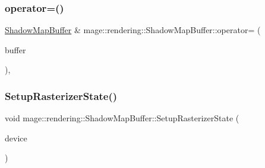\subsubsection{\texorpdfstring{operator=()}{operator=()}\hspace{0.1cm}{\footnotesize\ttfamily [2/2]}}
{\footnotesize\ttfamily \hyperlink{classmage_1_1rendering_1_1_shadow_map_buffer}{Shadow\+Map\+Buffer} \& mage\+::rendering\+::\+Shadow\+Map\+Buffer\+::operator= (\begin{DoxyParamCaption}\item[{\hyperlink{classmage_1_1rendering_1_1_shadow_map_buffer}{Shadow\+Map\+Buffer} \&\&}]{buffer }\end{DoxyParamCaption})\hspace{0.3cm}{\ttfamily [default]}, {\ttfamily [noexcept]}}

\hypertarget{classmage_1_1rendering_1_1_shadow_map_buffer_a04622e03086e5a16783bad043b8754a8}{}\label{classmage_1_1rendering_1_1_shadow_map_buffer_a04622e03086e5a16783bad043b8754a8} 
\subsubsection{\texorpdfstring{Setup\+Rasterizer\+State()}{SetupRasterizerState()}}
{\footnotesize\ttfamily void mage\+::rendering\+::\+Shadow\+Map\+Buffer\+::\+Setup\+Rasterizer\+State (\begin{DoxyParamCaption}\item[{I\+D3\+D11\+Device \&}]{device }\end{DoxyParamCaption})\hspace{0.3cm}{\ttfamily [private]}}

\hypertarget{classmage_1_1rendering_1_1_shadow_map_buffer_a3efe8318385c4807b1982873afa0e77b}{}\label{classmage_1_1rendering_1_1_shadow_map_buffer_a3efe8318385c4807b1982873afa0e77b} 
